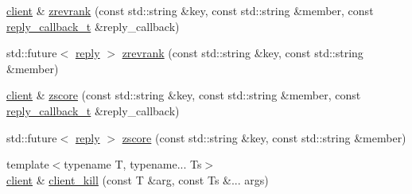 \begin{DoxyCompactItemize}
\item 
\hyperlink{classcpp__redis_1_1client}{client} \& \hyperlink{classcpp__redis_1_1client_a459f90ba39d9f9e90df5b756ec25db8b}{zrevrank} (const std\+::string \&key, const std\+::string \&member, const \hyperlink{classcpp__redis_1_1client_a061a1140d36d2eaeda82b09a0bb3f9f2}{reply\+\_\+callback\+\_\+t} \&reply\+\_\+callback)
\item 
std\+::future$<$ \hyperlink{classcpp__redis_1_1reply}{reply} $>$ \hyperlink{classcpp__redis_1_1client_a9870e21048277805b5eac2ce710089a0}{zrevrank} (const std\+::string \&key, const std\+::string \&member)
\item 
\hyperlink{classcpp__redis_1_1client}{client} \& \hyperlink{classcpp__redis_1_1client_a5e0a18243dee60595c82fc4a630f6d86}{zscore} (const std\+::string \&key, const std\+::string \&member, const \hyperlink{classcpp__redis_1_1client_a061a1140d36d2eaeda82b09a0bb3f9f2}{reply\+\_\+callback\+\_\+t} \&reply\+\_\+callback)
\item 
std\+::future$<$ \hyperlink{classcpp__redis_1_1reply}{reply} $>$ \hyperlink{classcpp__redis_1_1client_a72b20e861696db3e4dd5a4af96a1b427}{zscore} (const std\+::string \&key, const std\+::string \&member)
\item 
{\footnotesize template$<$typename T, typename... Ts$>$ }\\\hyperlink{classcpp__redis_1_1client}{client} \& \hyperlink{classcpp__redis_1_1client_ab3095cf010e10e9aa0b17a4408e6652e}{client\+\_\+kill} (const T \&arg, const Ts \&... args)
\end{DoxyCompactItemize}
